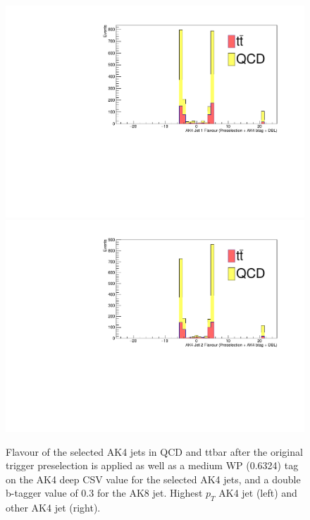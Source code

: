 \begin{figure}[thb!]
\begin{center}
\includegraphics[scale=0.35]{Figures/checkpreflavAK1PSMB.pdf}
\includegraphics[scale=0.35]{Figures/checkpreflavAK2PSMB.pdf}
\end{center}
\caption{Flavour of the selected AK4 jets in QCD and ttbar after the original trigger preselection is applied as well as a medium WP (0.6324) tag on the AK4 deep CSV value for the selected AK4 jets, and a double b-tagger value of 0.3 for the AK8 jet. Highest $p_{T}$ AK4 jet (left) and other AK4 jet (right).}
\label{fig:flav3}
\end{figure}


